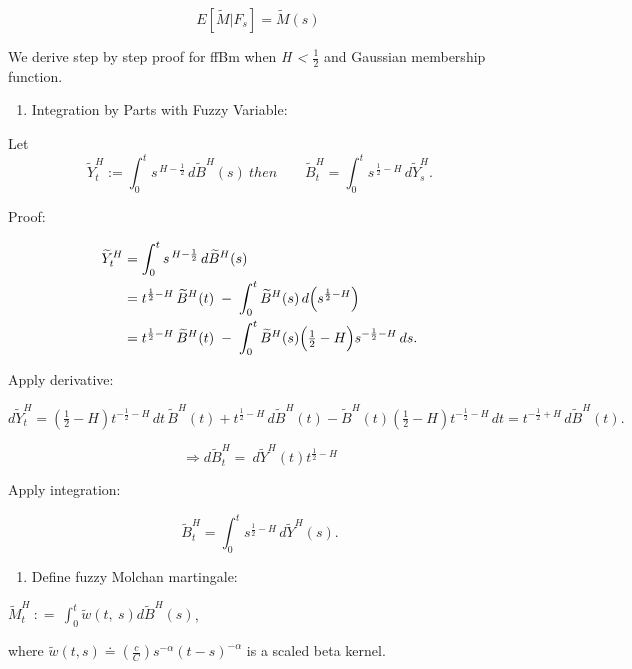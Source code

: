 \documentclass[12pt,a4paper]{report}
\numberwithin{equation}{section}
\begin{document}
\[E\left\lbrack \widetilde{M}|F_{s} \right\rbrack = \widetilde{M}(s)\ \]

We derive step by step proof for ffBm when \emph{H \textless{} $\frac{1}{2}$} and
Gaussian membership function.

\begin{enumerate}
\def\labelenumi{\arabic{enumi}.}
\item
  Integration by Parts with Fuzzy Variable:
\end{enumerate}
Let 
\[
\widetilde{Y}_t^{H} := \int_{0}^{t} s^{\,H-\frac{1}{2}}\, d\widetilde{B}^{H}(s)\ then
\qquad
\widetilde{B}_t^{H} = \int_{0}^{t} s^{\,\frac{1}{2}-H}\, d\widetilde{Y}_{s}^{H}.
\]


Proof:

\[
\begin{aligned}
\widetilde{Y}_{t}^{H}
&= \int_{0}^{t} s^{\,H-\frac{1}{2}}\,d\widetilde{B}^{H}(s) \\
&= t^{\frac{1}{2}-H}\,\widetilde{B}^{H}(t)\;-\;\int_{0}^{t}\widetilde{B}^{H}(s)\,d\!\left(s^{\frac{1}{2}-H}\right) \\
&= t^{\frac{1}{2}-H}\,\widetilde{B}^{H}(t)\;-\;\int_{0}^{t}\widetilde{B}^{H}(s)\Bigl(\tfrac{1}{2}-H\Bigr)s^{-\frac{1}{2}-H}\,ds .
\end{aligned}
\]


Apply derivative:

\[
d\widetilde{Y}_{t}^{H}
= \left(\tfrac{1}{2}-H\right)t^{-\frac{1}{2}-H}\,dt\,\widetilde{B}^{H}(t)
+ t^{\frac{1}{2}-H}\,d\widetilde{B}^{H}(t)
- \widetilde{B}^{H}(t)\left(\tfrac{1}{2}-H\right)t^{-\frac{1}{2}-H}\,dt
= t^{-\frac{1}{2}+H}\,d\widetilde{B}^{H}(t).
\]


\[\Rightarrow {d\widetilde{B}}_{t}^{H} = \ d{\widetilde{Y}}^{H}(t)t^{\frac{1}{2} - H}\]

Apply integration:

\begin{equation}\tag{5.1.42}
\widetilde{B}_{t}^{H}=\int_{0}^{t}s^{\frac{1}{2}-H}\,d\widetilde{Y}^{H}(s).
\end{equation}


\begin{enumerate}
\def\labelenumi{\arabic{enumi}.}
\setcounter{enumi}{1}
\item
  Define fuzzy Molchan martingale:
\end{enumerate}

\({\widetilde{M}}_{t}^{H}\ : = \ \int_{0}^{t}{\widetilde{w}(t,\ s){d\widetilde{B}}^{H}(s)}\),

where
\(\widetilde{w}(t,s) \doteq (\frac{c}{C})s^{- \alpha}{(t - s)}^{- \alpha}\)
is a scaled beta kernel.
\end{document}
